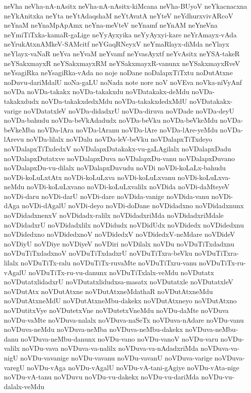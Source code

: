{neVha
neVha-nA-nAsitx
neVha-nA-nAsitx-kiMcana
neVha-BUyoV
neYkacnacxna
neYkAnitxka
neYta
neYtAdaqshaM
neYtAvatA
neYteV
neYdhurxvivARcoV
neYnaM
neYnaMpApAmx
neYna-meVteV
neYnamf
neYnAM
neYneVna
neYmiTiTxka-kamaR-gaLige
neYyAyxyika
neYyAyxyi-kare
neYrAmayx-vAda
neYrukAtxnAMkeV-SAMcitf
neYGaqRNeyxV
neYmaRlayx-diMda
neYlayx
neYlayx-vaNaR
neYva
neYvaM
neYvamf
neYvasAyxtf
neYvAsitx
neYSA-takeR
neYSakxmayxR
neYSakxmayxRM
neYSakxmayxR-vanunx
neYSakxmayxRveV
neYsagiRka
neYsagiRka-vAda
no
noje
noDane
noDalapxTiTxtu
noDutAtxne
noDuvu-dariMdalU
noNa-gaLU
noNada
note
nore
noV
noVEva
noVka-niVyAnf
noVDa
noVDa-takakx
noVDa-takakxdu
noVDatakakx-deMdu
noVDa-takakxdudx
noVDa-takakxdedxMdu
noVDa-takakxdedxMdU
noVDatakakx-varige
noVDatatxleV
noVDa-didadxrU
noVDa-diruva
noVDade
noVDa-deyU
noVDa-bahudu
noVDa-beVkAdadudx
noVDa-beVku
noVDa-beVkeMdu
noVDa-beVkeMba
noVDa-lAra
noVDa-lAranu
noVDa-lAre
noVDa-lAre-yeMdu
noVDa-lArevu
noVDa-lilalx
noVDalu
noVDa-leV-beVku
noVDalapxTiTxdeyo
noVDalapxTiTxdedxV
noVDalapxDatakakx-vu-gaLAgilalx
noVDalapxDadu
noVDalapxDutatxve
noVDalapxDuva
noVDalapxDu-vanu
noVDalapxDuvano
noVDalapxDu-vu-dilalx
noVDalapxDuvudu
noVDi
noVDi-koLaLx-bahudu
noVDi-koLuLxtAtx
noVDi-koLuLxva
noVDi-koLuLxvanu
noVDi-koLuLxva-neMdu
noVDi-koLuLxvano
noVDi-koLuLxvalilx
noVDida
noVDi-daMteyeV
noVDi-daru
noVDi-darU
noVDi-dare
noVDida-vanige
noVDida-vanu
noVDi-dAga
noVDi-dAgalU
noVDi-deyo
noVDi-doDane
noVDidadxno
noVDidadxnunx
noVDidadxnenxV
noVDidadx-ralilx
noVDidadxriMda
noVDidadxriMdale
noVDidadxrU
noVDidadxlilx
noVDidudx
noVDidUdx
noVDidedx
noVDidedxnu
noVDidedxno
noVDidedxnoV
noVDidedxV
noVDidedxV-neMdare
noVDideV
noVDiyU
noVDiye
noVDiyeV
noVDiri
noVDilalx
noVDu
noVDuTiTxdadxnu
noVDuTiTxdadxnoV
noVDuTiTxdadxrU
noVDuTiTxra-beVku
noVDuTiTxra-lilalx
noVDuTiTx-ralu
noVDuTiTx-ruvaMte
noVDuTiTxru-vanu
noVDuTiTx-ru-vAgalU
noVDuTiTx-ru-vu-danunx
noVDuTiTxlalx-veMdu
noVDutatx
noVDutatxlidadxrU
noVDutatxlidudxsa-masatx
noVDutatxle
noVDutatxleV
noVDutAtx
noVDutAtxne
noVDutAtxneMdathaR
noVDutAtxneMdu
noVDutAtxneMdU
noVDutAtxneMbu-dakekx
noVDutAtxneyo
noVDutAtxno
noVDutitxVye
noVDutetxVne
noVDutetxVneMdu
noVDu-daMte
noVDuva
noVDu-vaMte
noVDuva-nalalx
noVDuva-naSeTx
noVDuva-nAdare
noVDu-vanu
noVDuva-neMdu
noVDuva-neMba
noVDuva-neMbu-dakekx
noVDuva-neMbu-danu
noVDuva-neMbu-danunx
noVDu-vano
noVDu-vanoV
noVDu-varu
noVDu-valilx
noVDu-vava
noVDuva-va-nalilx
noVDuva-va-nAdadxriMda
noVDuva-va-nigU
noVDu-vavanige
noVDu-vavanu
noVDu-vavanU
noVDuva-varige
noVDuva-varegU
noVDu-vAga
noVDu-vAgalU
noVDu-vA-tani-gAgiye
noVDu-vAta-nige
noVDu-vA-tanu
noVDuvu
noVDu-vu-dakekx
noVDu-vu-dariMda
noVDu-vu-dalalx-veMdu
}

